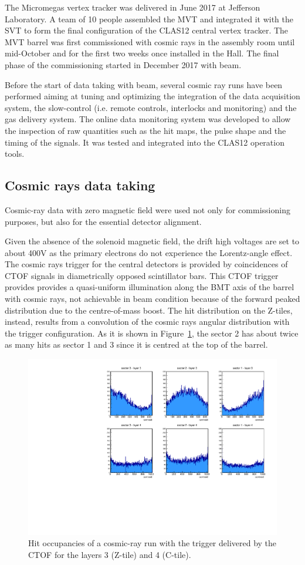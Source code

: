 The Micromegas vertex tracker was delivered in June 2017 at Jefferson Laboratory. A team of 10 people assembled the MVT and integrated it with the SVT to form the final configuration of the CLAS12 central vertex tracker.  The MVT barrel was first commissioned with cosmic rays in the assembly room until mid-October and for the first two weeks once installed in the Hall. The final phase of the commissioning started in December 2017 with beam.

Before the start of data taking with beam, several cosmic ray runs have been performed aiming at tuning and optimizing the integration of the data acquisition system, the slow-control (i.e. remote controls, interlocks and monitoring) and the gas delivery system. The online data monitoring system was developed to allow the inspection of raw quantities such as the hit maps, the pulse shape and the timing of the signals. It was tested and integrated into the CLAS12 operation tools. 

\subsection{Cosmic rays data taking}
\label{sec:cosmics}

Cosmic-ray data with zero magnetic field were used not only for commissioning purposes, but also for the essential detector alignment.

Given the absence of the solenoid magnetic field, the drift high voltages are set to about 400V as the primary electrons do not experience the Lorentz-angle effect. The cosmic rays trigger for the central detectors is provided by coincidences of CTOF signals in diametrically opposed scintillator bars. This CTOF trigger provides provides a quasi-uniform illumination along the BMT axis of the barrel with cosmic rays, not achievable in beam condition because of the forward peaked distribution due to the centre-of-mass boost. The hit distribution on the Z-tiles, instead, results from a convolution of the cosmic rays angular distribution with the trigger configuration. As it is shown in Figure~\ref{fig:mm-cosmic_occupancy}, the sector 2 has about twice as many hits as sector 1 and 3 since it is centred at the top of the barrel. %

\begin{figure}[htb]
 \includegraphics[width=.45\textwidth]{images/BMT_hit_cosmics_CTOFtrigger.pdf}
 \caption{Hit occupancies of a cosmic-ray run with the trigger delivered by the CTOF for the layers 3 (Z-tile) and 4 (C-tile).}
 \label{fig:mm-cosmic_occupancy}
\end{figure}


